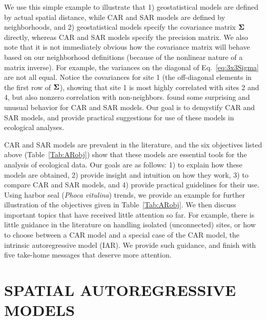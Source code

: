 \documentclass[11pt, titlepage]{article}\usepackage[]{graphicx}\usepackage[]{color}
\begin{document}
\begin{spacing}{1.9}
\begin{flushleft}
We use this simple example to illustrate that 1) geostatistical models are defined by actual spatial distance, while CAR and SAR models are defined by neighborhoods, and 2) geostatistical models specify the covariance matrix $\mbox{\boldmath $\Sigma$}$ directly, whereas CAR and SAR models specify the precision matrix.  We also note that it is not immediately obvious how the covariance matrix will behave based on our neighborhood definitions (because of the nonlinear nature of a matrix inverse).  For example, the variances on the diagonal of Eq.~\ref{eq:3x3Sigma} are not all equal. Notice the covariances for site 1 (the off-diagonal elements in the first row of $\mbox{\boldmath $\Sigma$}$), showing that site 1 is most highly correlated with sites 2 and 4, but also nonzero correlation with non-neighbors. \citet{Wall:clos:2004} found some surprising and unusual behavior for CAR and SAR models.  Our goal is to demystify CAR and SAR models, and provide practical suggestions for use of these models in ecological analyses. 

CAR and SAR models are prevalent in the literature, and the six objectives listed above (Table~\ref{Tab:ARobj}) show that these models are essential tools for the analysis of ecological data.  Our goals are as follows: 1) to explain how these models are obtained, 2) provide insight and intuition on how they work, 3) to compare CAR and SAR models, and 4) provide practical guidelines for their use. Using harbor seal (\emph{Phoca vitulina}) trends, we provide an example for further illustration of the objectives given in Table~\ref{Tab:ARobj}. We then discuss important topics that have received little attention so far.  For example, there is little guidance in the literature on handling isolated (unconnected) sites, or how to choose between a CAR model and a special case of the CAR model, the intrinsic autoregressive model (IAR).  We provide such guidance, and finish with five take-home messages that deserve more attention.
 

\section*{SPATIAL AUTOREGRESSIVE MODELS}


\end{flushleft}
\end{spacing}
\end{document}
